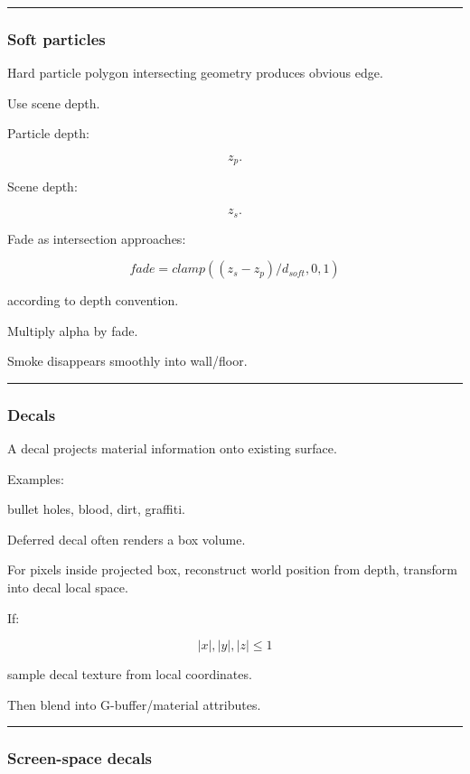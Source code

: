 \begin{center}\rule{0.5\linewidth}{0.5pt}\end{center}

\subsubsection{Soft particles}\label{soft-particles}

Hard particle polygon intersecting geometry produces obvious edge.

Use scene depth.

Particle depth:

\[
z_p.
\]

Scene depth:

\[
z_s.
\]

Fade as intersection approaches:

\[
\boxed{
fade=
clamp(
(z_s-z_p)/d_{soft},
0,1
)
}
\]

according to depth convention.

Multiply alpha by fade.

Smoke disappears smoothly into wall/floor.

\begin{center}\rule{0.5\linewidth}{0.5pt}\end{center}

\subsubsection{Decals}\label{decals}

A decal projects material information onto existing surface.

Examples:

bullet holes, blood, dirt, graffiti.

Deferred decal often renders a box volume.

For pixels inside projected box, reconstruct world position from depth, transform into decal local space.

If:

\[
|x|,|y|,|z|\le1
\]

sample decal texture from local coordinates.

Then blend into G-buffer/material attributes.

\begin{center}\rule{0.5\linewidth}{0.5pt}\end{center}

\subsubsection{Screen-space decals}\label{screen-space-decals}

